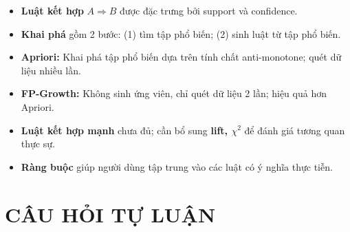 \documentclass[10pt]{article}
\begin{document}
\begin{itemize}
    \item \textbf{Luật kết hợp} $A \Rightarrow B$ được đặc trưng bởi support và confidence.
    \item \textbf{Khai phá} gồm 2 bước: (1) tìm tập phổ biến; (2) sinh luật từ tập phổ biến.
    \item \textbf{Apriori:} Khai phá tập phổ biến dựa trên tính chất anti-monotone; quét dữ liệu nhiều lần.
    \item \textbf{FP-Growth:} Không sinh ứng viên, chỉ quét dữ liệu 2 lần; hiệu quả hơn Apriori.
    \item \textbf{Luật kết hợp mạnh} chưa đủ; cần bổ sung \textbf{lift, $\chi^2$} để đánh giá tương quan thực sự.
    \item \textbf{Ràng buộc} giúp người dùng tập trung vào các luật có ý nghĩa thực tiễn.
\end{itemize}

\newpage
\section{CÂU HỎI TỰ LUẬN}
\end{document}
